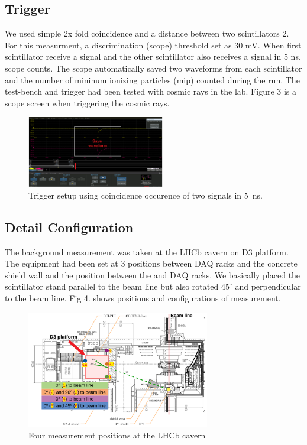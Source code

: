 \subsection{Trigger}
We used simple 2x fold coincidence and a distance between two scintillators 2\cm. 
For this measurment, a discrimination (scope) threshold set as 30 mV.
When first scintillator receive a signal and the other scintillator also receives a signal in 5 ns, scope counts.
The scope automatically saved two waveforms from each scintillator and the number of mininum ionizing particles (mip) counted during the run.
The test-bench and trigger had been tested with cosmic rays in the lab.
Figure 3 is a scope screen when triggering the cosmic rays.

\begin{figure}[!h]
\centering
    \includegraphics[width=6cm]{figs/INT/waveform.pdf}
\caption{
    Trigger setup using coincidence occurence of two signals in 5~ns. 
}
\end{figure}

\subsection{Detail Configuration}

The background measurement was taken at the LHCb cavern on D3 platform. The equipment had been set at 3 positions between DAQ racks and the concrete shield wall and the position between the \delphi and DAQ racks.
We basically placed the scintillator stand parallel to the beam line but also rotated $45^{\circ}$ and perpendicular to the beam line.
Fig 4. shows positions and configurations of measurement.

\begin{figure}[h]
\centering
    \includegraphics[width=8cm]{figs/INT/configuration.pdf}
\caption{
    Four measurement positions at the LHCb cavern
}
\end{figure}

